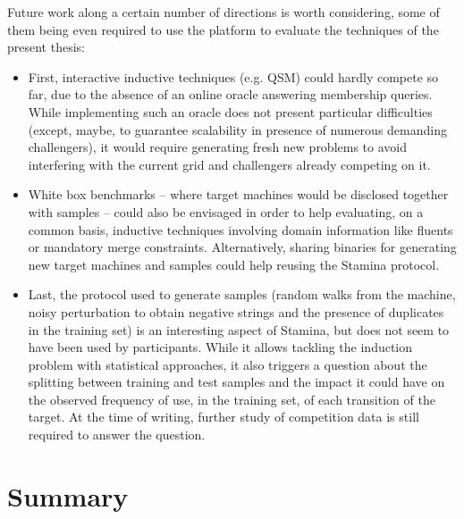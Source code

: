 Future work along a certain number of directions is worth considering, some of them being even required to use the platform to evaluate the techniques of the present thesis:

\begin{itemize}

\item First, interactive inductive techniques (e.g. QSM) could hardly compete so far, due to the absence of an online oracle answering membership queries. While implementing such an oracle does not present particular difficulties (except, maybe, to guarantee scalability in presence of numerous demanding challengers), it would require generating fresh new problems to avoid interfering with the current grid and challengers already competing on it. 

\item White box benchmarks -- where target machines would be disclosed together with samples -- could also be envisaged in order to help evaluating, on a common basis, inductive techniques involving domain information like fluents or mandatory merge constraints. Alternatively, sharing binaries for generating new target machines and samples could help reusing the Stamina protocol. 

\item Last, the protocol used to generate samples (random walks from the machine, noisy perturbation to obtain negative strings and the presence of duplicates in the training set) is an interesting aspect of Stamina, but does not seem to have been used by participants. While it allows tackling the induction problem with statistical approaches, it also triggers a question about the splitting between training and test samples and the impact it could have on the observed frequency of use, in the training set, of each transition of the target. At the time of writing, further study of competition data is still required to answer the question.

\end{itemize}

\section*{Summary}

